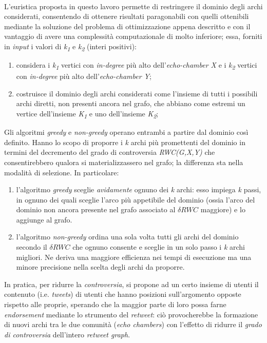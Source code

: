 \\
L'euristica proposta in questo lavoro permette di restringere il dominio degli archi considerati, consentendo di ottenere risultati paragonabili con quelli ottenibili mediante la soluzione del problema di ottimizzazione appena descritto e con il vantaggio di avere una complessità computazionale di molto inferiore; essa, forniti in \textit{input} i valori di \textit{k\textsubscript{1}} e \textit{k\textsubscript{2}} (interi positivi):
\begin{enumerate}
\item considera i \textit{k\textsubscript{1}} vertici con \textit{in-degree} più alto dell'\textit{echo-chamber X} e i \textit{k\textsubscript{2}} vertici con \textit{in-degree} più alto dell'\textit{echo-chamber Y};
\item costruisce il dominio degli archi considerati come l'insieme di tutti i possibili archi diretti, non presenti ancora nel grafo, che abbiano come estremi un vertice dell'insieme \textit{K\textsubscript{1}} e uno dell'insieme \textit{K\textsubscript{2}};  
\end{enumerate}
Gli algoritmi \textit{greedy} e \textit{non-greedy} operano entrambi a partire dal dominio così definito. Hanno lo scopo di proporre i \textit{k} archi più promettenti del dominio in termini del decremento del grado di controversia \textit{RWC(G,X,Y)} che consentirebbero qualora si materializzassero nel grafo; la differenza sta nella modalità di selezione. In particolare:
\begin{enumerate}
\item l'algoritmo \textit{greedy} sceglie \textit{avidamente} ognuno dei \textit{k} archi: esso impiega \textit{k} passi, in ognuno dei quali sceglie l'arco più appetibile del dominio (ossia l'arco del dominio non ancora presente nel grafo associato al $\delta RWC$ maggiore) e lo aggiunge al grafo.
\item l'algoritmo \textit{non-greedy} ordina una sola volta tutti gli archi del dominio secondo il $\delta RWC$ che ognuno consente e sceglie in un solo passo i \textit{k} archi migliori. Ne deriva una maggiore efficienza nei tempi di esecuzione ma una minore precisione nella scelta degli archi da proporre.
\end{enumerate}
In pratica, per ridurre la \textit{controversia}, si propone ad un certo insieme di utenti il contenuto (i.e. \textit{tweets}) di utenti che hanno posizioni sull'argomento opposte rispetto alle proprie, sperando che la maggior parte di loro possa farne \textit{endorsement} mediante lo strumento del \textit{retweet}: ciò provocherebbe la formazione di nuovi archi tra le due comunità (\textit{echo chambers}) con l'effetto di ridurre il \textit{grado di controversia} dell'intero \textit{retweet graph}.  
